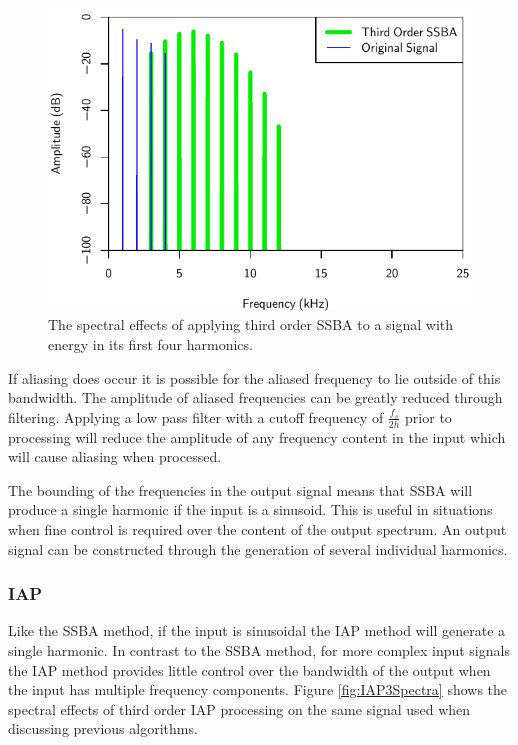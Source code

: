 			\begin{figure}[h!]
				\centering
				\includegraphics{chapter5/Images/SSBA3Spectra.pdf}
				\caption{The spectral effects of applying third order SSBA to a signal with energy in its 
				         first four harmonics.}
				\label{fig:SSBA3Spectra}
			\end{figure}

			If aliasing does occur it is possible for the aliased frequency to lie outside of this bandwidth.
			The amplitude of aliased frequencies can be greatly reduced through filtering. Applying a low pass
			filter with a cutoff frequency of $\frac{f_{s}}{2h}$ prior to processing will reduce the amplitude
			of any frequency content in the input which will cause aliasing when processed.

			The bounding of the frequencies in the output signal means that SSBA will produce a single harmonic
			if the input is a sinusoid. This is useful in situations when fine control is required over the
			content of the output spectrum. An output signal can be constructed through the generation of
			several individual harmonics.

		\subsubsection*{IAP}
			Like the SSBA method, if the input is sinusoidal the IAP method will generate a single harmonic. In
			contrast to the SSBA method, for more complex input signals the IAP method provides little control
			over the bandwidth of the output when the input has multiple frequency components. Figure
			\ref{fig:IAP3Spectra} shows the spectral effects of third order IAP processing on the same signal
			used when discussing previous algorithms.

